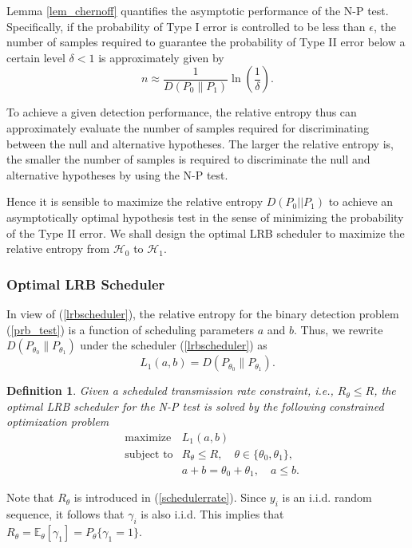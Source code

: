 \documentclass[journal]{IEEEtran}
\def\bE{\mathbb{E}}
\def\cH{\mathcal{H}}
\newtheorem{defi}{Definition}
\begin{document}
Lemma \ref{lem_chernoff}  quantifies the asymptotic performance of the N-P test. Specifically, if the probability of Type I error is controlled to be less than $\epsilon$, the number of samples required to guarantee the probability of Type II error below a certain level $\delta<1$ is approximately given by
\begin{equation}
n \approx \frac{1}{{D({P_0}\lVert{P_1})}}\ln \left( {\frac{1}{\delta }} \right).
\end{equation}

To achieve a given detection performance, the relative entropy thus can approximately evaluate the number of samples required for discriminating between the null and alternative hypotheses. The larger the relative entropy is, the smaller the number of samples is required to discriminate the null and alternative hypotheses by using the N-P test.

Hence it is sensible to maximize the relative entropy $D({P_0} || {P_1})$ to achieve an asymptotically optimal hypothesis test in the sense of minimizing the probability of the Type II error. We shall design the optimal LRB scheduler to maximize the relative entropy from $\cH_0$ to $\cH_1$.\\

\subsubsection{Optimal LRB Scheduler}
In view of (\ref{lrbscheduler}), the relative entropy for the binary detection problem (\ref{prb_test}) is a function of scheduling parameters $a$ and $b$. Thus, we rewrite $D({P_{\theta_0}}\lVert{P_{\theta_1}})$ under the scheduler  (\ref{lrbscheduler}) as
\begin{equation}\label{reentropy}
L_{1}(a,b)=D({P_{\theta_0}}\lVert{P_{\theta_1}}).
\end{equation}
\begin{defi}
Given a scheduled transmission rate constraint, i.e., $R_\theta\leqslant R$, the optimal LRB scheduler for the N-P test is solved by the following constrained optimization problem
\begin{eqnarray*}
&\text{maximize} & L_{1}(a,b)\\
&\text{subject to}& R_{\theta}\leqslant R ,\quad \theta\in\{\theta_0, \theta_1\},\\
&&a+b=\theta_0+\theta_1,\quad a\leqslant b.
\end{eqnarray*}
\end{defi}
Note that $R_\theta$ is introduced in (\ref{schedulerrate}). Since $y_i$ is an i.i.d. random sequence, it follows that $\gamma_i$ is also i.i.d. This implies that $R_\theta=\bE_\theta[\gamma_1]=P_\theta\{\gamma_1=1\}$.
\end{document}
